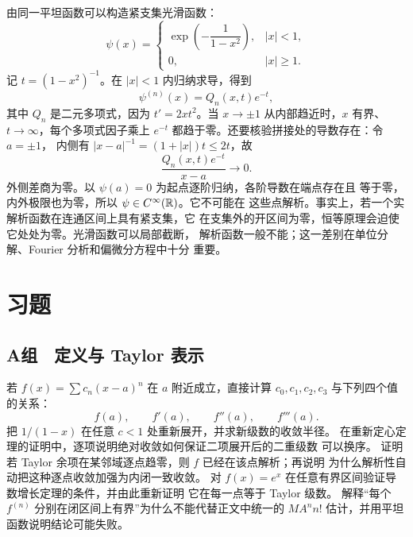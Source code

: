 由同一平坦函数可以构造紧支集光滑函数：
\[
 \psi(x)=
 \begin{cases}
 \exp\!\left(-\dfrac1{1-x^2}\right),&|x|<1,\\
 0,&|x|\ge1.
 \end{cases}
\]
记 \(t=(1-x^2)^{-1}\)。在 \(|x|<1\) 内归纳求导，得到
\[
 \psi^{(n)}(x)=Q_n(x,t)e^{-t},
\]
其中 \(Q_n\) 是二元多项式，因为 \(t'=2xt^2\)。当 \(x\to\pm1\)
从内部趋近时，\(x\) 有界、\(t\to\infty\)，每个多项式因子乘上
\(e^{-t}\) 都趋于零。还要核验拼接处的导数存在：令 \(a=\pm1\)，
内侧有 \(|x-a|^{-1}=(1+|x|)t\le2t\)，故
\[
 \frac{Q_n(x,t)e^{-t}}{x-a}\longrightarrow0.
\]
外侧差商为零。以 \(\psi(a)=0\) 为起点逐阶归纳，各阶导数在端点存在且
等于零，内外极限也为零，所以 \(\psi\in C^\infty(\mathbb{R})\)。它不可能在
这些点解析。事实上，若一个实解析函数在连通区间上具有紧支集，它
在支集外的开区间为零，恒等原理会迫使它处处为零。光滑函数可以局部截断，
解析函数一般不能；这一差别在单位分解、Fourier 分析和偏微分方程中十分
重要。

\section*{习题}

\subsection*{A组　定义与 Taylor 表示}
\begin{enumerate}[label=\textbf{\thechapter.\arabic*.}]
若 \(f(x)=\sum c_n(x-a)^n\) 在 \(a\) 附近成立，直接计算
\(c_0,c_1,c_2,c_3\) 与下列四个值的关系：
\[
 f(a),\qquad f'(a),\qquad f''(a),\qquad f'''(a).
\]
 把 \(1/(1-x)\) 在任意 \(c<1\) 处重新展开，并求新级数的收敛半径。
 在重新定心定理的证明中，逐项说明绝对收敛如何保证二项展开后的二重级数
 可以换序。
 证明若 Taylor 余项在某邻域逐点趋零，则 \(f\) 已经在该点解析；再说明
 为什么解析性自动把这种逐点收敛加强为内闭一致收敛。
 对 \(f(x)=e^x\) 在任意有界区间验证导数增长定理的条件，并由此重新证明
 它在每一点等于 Taylor 级数。
 解释“每个 \(f^{(n)}\) 分别在闭区间上有界”为什么不能代替正文中统一的
 \(MA^nn!\) 估计，并用平坦函数说明结论可能失败。
\end{enumerate}

